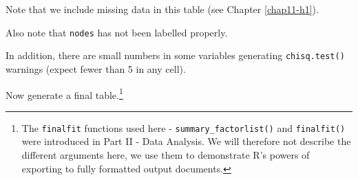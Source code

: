 \documentclass[
  12pt,
  krantz2]{krantz}
\begin{document}
\begin{table}[!h]

\caption{\label{tab:unnamed-chunk-3}Exporting 'table 1': Tumour differentiation by patient and disease factors.}
\centering
{}
\end{table}

Note that we include missing data in this table (see Chapter \ref{chap11-h1}).

Also note that \texttt{nodes} has not been labelled properly.

In addition, there are small numbers in some variables generating \texttt{chisq.test()} warnings (expect fewer than 5 in any cell).

Now generate a final table.\footnote{The \texttt{finalfit} functions used here - \texttt{summary\_factorlist()} and \texttt{finalfit()} were introduced in Part II - Data Analysis. We will therefore not describe the different arguments here, we use them to demonstrate R's powers of exporting to fully formatted output documents.}
\end{document}
